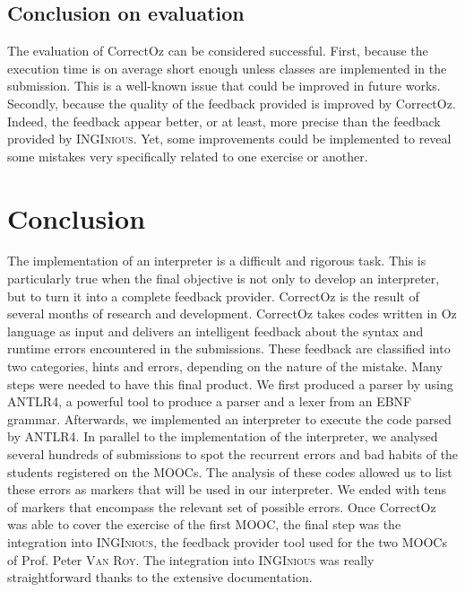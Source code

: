 \documentclass[11pt,a4paper,twoside,openright]{report}
\begin{document}
\section{Conclusion on evaluation}

The evaluation of CorrectOz can be considered successful. First, because the 
execution time is on average short enough unless classes are implemented 
in the submission. This is a well-known issue that could be improved in future 
works. Secondly, because the quality of the feedback provided is improved by 
CorrectOz. Indeed, the feedback appear better, or at least, more precise 
than the feedback provided by \textsc{INGInious}. Yet, some improvements 
could be implemented to reveal some mistakes very specifically related to one 
exercise or another.

\chapter{Conclusion}

The implementation of an interpreter is a difficult and rigorous task. This is 
particularly true  
when the final objective is not only to develop an interpreter, but to turn it 
into a complete feedback provider. CorrectOz is the result of several months of research 
and development. CorrectOz takes codes written in Oz language as input and
delivers an intelligent feedback about the syntax and runtime
errors encountered in the submissions. 
These feedback are classified into 
 two categories, hints and errors, depending on the nature of the mistake.
 Many steps were needed to have this final product. We first produced a
 parser by using ANTLR4, a powerful tool to produce a parser and a lexer
 from an EBNF grammar. Afterwards, we implemented an interpreter 
 to execute the code parsed by ANTLR4. In parallel to the implementation 
 of the interpreter, we analysed several hundreds of submissions 
 to spot the recurrent errors and bad habits of the students registered on the 
 MOOCs. The analysis of these codes allowed us to list these errors as markers
 that will be used in our interpreter. We ended with tens of markers that 
 encompass the relevant set of possible errors. Once CorrectOz 
 was able to cover the exercise of the first MOOC, the final step was the 
 integration into \textsc{INGInious}, the feedback provider tool used for the 
 two MOOCs of Prof. Peter \textsc{Van Roy}. The integration into 
\textsc{INGInious} 
 was really straightforward thanks to the extensive documentation.\\
 
\end{document}
